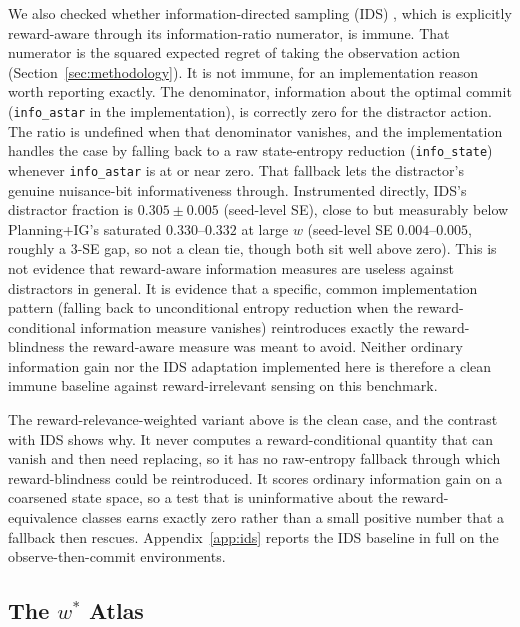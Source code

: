 We also checked whether information-directed sampling (IDS) \citep{russo2014}, which is explicitly reward-aware through its information-ratio numerator, is immune. That numerator is the squared expected regret of taking the observation action (Section~\ref{sec:methodology}). It is not immune, for an implementation reason worth reporting exactly. The denominator, information about the optimal commit (\texttt{info\_\allowbreak astar} in the implementation), is correctly zero for the distractor action. The ratio is undefined when that denominator vanishes, and the implementation handles the case by falling back to a raw state-entropy reduction (\texttt{info\_\allowbreak state}) whenever \texttt{info\_\allowbreak astar} is at or near zero. That fallback lets the distractor's genuine nuisance-bit informativeness through. Instrumented directly, IDS's distractor fraction is $0.305 \pm 0.005$ (seed-level SE), close to but measurably below Planning+IG's saturated $0.330$--$0.332$ at large $w$ (seed-level SE $0.004$--$0.005$, roughly a $3$-SE gap, so not a clean tie, though both sit well above zero). This is not evidence that reward-aware information measures are useless against distractors in general. It is evidence that a specific, common implementation pattern (falling back to unconditional entropy reduction when the reward-conditional information measure vanishes) reintroduces exactly the reward-blindness the reward-aware measure was meant to avoid. Neither ordinary information gain nor the IDS adaptation implemented here is therefore a clean immune baseline against reward-irrelevant sensing on this benchmark.

The reward-relevance-weighted variant above is the clean case, and the contrast with IDS shows why. It never computes a reward-conditional quantity that can vanish and then need replacing, so it has no raw-entropy fallback through which reward-blindness could be reintroduced. It scores ordinary information gain on a coarsened state space, so a test that is uninformative about the reward-equivalence classes earns exactly zero rather than a small positive number that a fallback then rescues. Appendix~\ref{app:ids} reports the IDS baseline in full on the observe-then-commit environments.

\subsection{The $w^*$ Atlas}
\label{sec:w_atlas}


